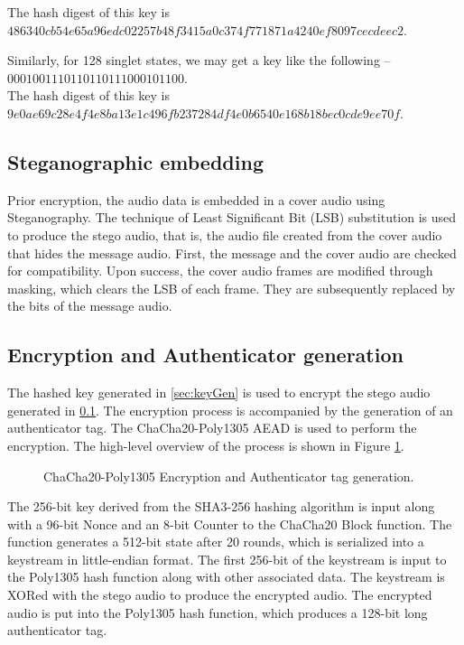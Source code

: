 \documentclass[a4paper]{cas-sc}
\begin{document}
\noindent The hash digest of this key is $486340cb54e65a96edc02257b48f3415a0c374f771871a4240ef8097cecdeec2$.

Similarly, for 128 singlet states, we may get a key like the following -- $0001001110110110111000101100$. \\
The hash digest of this key is $9e0ae69c28e4f4e8ba13e1c496fb237284df4e0b6540e168b18bec0cde9ee70f$.
\subsection{Steganographic embedding}
\label{sec:stegoEncode}
Prior encryption, the audio data is embedded in a cover audio using Steganography. The technique of Least Significant Bit (LSB) substitution is used to produce the stego audio, that is, the audio file created from the cover audio that hides the message audio. First, the message and the cover audio are checked for compatibility. Upon success, the cover audio frames are modified through masking, which clears the LSB of each frame. They are subsequently replaced by the bits of the message audio.
\subsection{Encryption and Authenticator generation}
\label{sec:chacha20poly1305encryption}
The hashed key generated in \ref{sec:keyGen} is used to encrypt the stego audio generated in \ref{sec:stegoEncode}. The encryption process is accompanied by the generation of an authenticator tag. The ChaCha20-Poly1305 AEAD is used to perform the encryption. The high-level overview of the process is shown in Figure \ref{fig:chacha20poly1305encryption}.
\begin{figure}[pos=h]
    \centering
    
    \caption{ChaCha20-Poly1305 Encryption and Authenticator tag generation.}
    \label{fig:chacha20poly1305encryption}
\end{figure}

The 256-bit key derived from the SHA3-256 hashing algorithm is input along with a 96-bit Nonce and an 8-bit Counter to the ChaCha20 Block function. The function generates a 512-bit state after 20 rounds, which is serialized into a keystream in little-endian format. The first 256-bit of the keystream is input to the Poly1305 hash function along with other associated data. The keystream is XORed with the stego audio to produce the encrypted audio. The encrypted audio is put into the Poly1305 hash function, which produces a 128-bit long authenticator tag.
\end{document}

